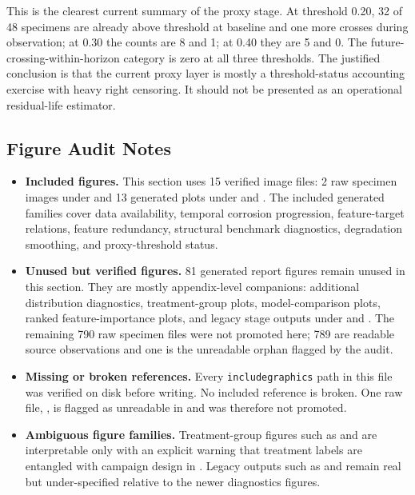 \documentclass[main.tex]{subfiles}
\begin{document}
This is the clearest current summary of the proxy stage. At threshold 0.20, 32 of 48 specimens are already above threshold at baseline and one more crosses during observation; at 0.30 the counts are 8 and 1; at 0.40 they are 5 and 0. The future-crossing-within-horizon category is zero at all three thresholds. The justified conclusion is that the current proxy layer is mostly a threshold-status accounting exercise with heavy right censoring. It should not be presented as an operational residual-life estimator.

\subsection{Figure Audit Notes}

\begin{itemize}
    \item \textbf{Included figures.} This section uses 15 verified image files: 2 raw specimen images under  and 13 generated plots under  and . The included generated families cover data availability, temporal corrosion progression, feature-target relations, feature redundancy, structural benchmark diagnostics, degradation smoothing, and proxy-threshold status.
    \item \textbf{Unused but verified figures.} 81 generated report figures remain unused in this section. They are mostly appendix-level companions: additional distribution diagnostics, treatment-group plots, model-comparison plots, ranked feature-importance plots, and legacy stage outputs under  and . The remaining 790 raw specimen files were not promoted here; 789 are readable source observations and one is the unreadable orphan flagged by the audit.
    \item \textbf{Missing or broken references.} Every \texttt{includegraphics} path in this file was verified on disk before writing. No included reference is broken. One raw file, , is flagged as unreadable in  and was therefore not promoted.
    \item \textbf{Ambiguous figure families.} Treatment-group figures such as  and  are interpretable only with an explicit warning that treatment labels are entangled with campaign design in . Legacy outputs such as  and  remain real but under-specified relative to the newer diagnostics figures.

\end{itemize}
\end{document}
